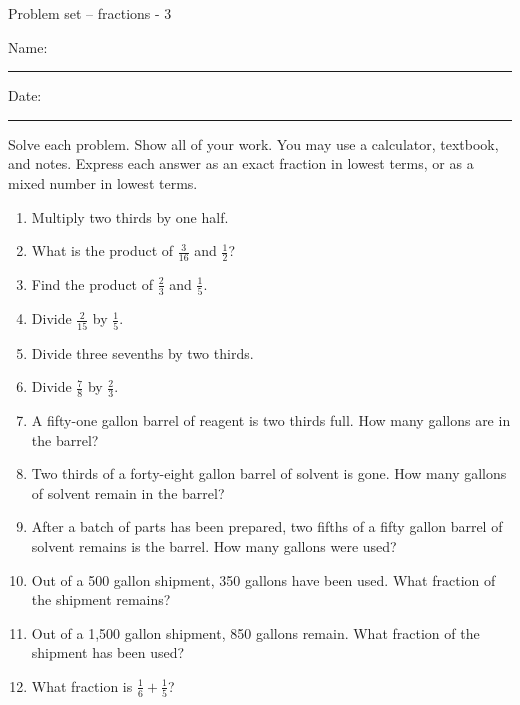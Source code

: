 \documentclass[12pt]{article}
\begin{document}
\pagestyle{empty} %
\begin{center}
          Problem set -- fractions - 3 \\[0.5in]
\end{center}
Name: \rule{4in}{0.005in} Date: \rule{1.5in}{0.005in} 

Solve each problem. Show all of your work. You may use a calculator, textbook, and notes. Express each answer as an exact fraction in lowest terms, or as a mixed number in lowest terms. 
\begin{enumerate}
		\newcommand{\spacing}{\vspace{0.45in}}
\item Multiply two thirds by one half. 
\spacing

\item What is the product of $\frac{3}{16}$ and $\frac{1}{2}$?  
\spacing

\item Find the product of $\frac{2}{3}$ and $\frac{1}{5}$.
\spacing

\item Divide $\frac{2}{15}$ by $\frac{1}{5}$.
\spacing

\item Divide three sevenths by two thirds. 
\spacing

\item Divide $\frac{7}{8}$ by $\frac{2}{3}$. 
\spacing

\item A fifty-one gallon barrel of reagent is two thirds full. How many gallons are in the barrel? 
\spacing

\item Two thirds of a forty-eight gallon barrel of solvent is gone. How many gallons of solvent remain in the barrel? 
\spacing

\item After a batch of parts has been prepared, two fifths of a fifty gallon barrel of solvent remains is the barrel. How many gallons were used? 
\spacing

\item Out of a 500 gallon shipment, 350 gallons have been used. What fraction of the shipment remains?
\spacing

\item Out of a 1,500 gallon shipment, 850 gallons remain. What fraction of the shipment has been used?
\spacing

\item What fraction is $\frac{1}{6} + \frac{1}{5}$? 
\spacing


\end{enumerate}
\end{document}
